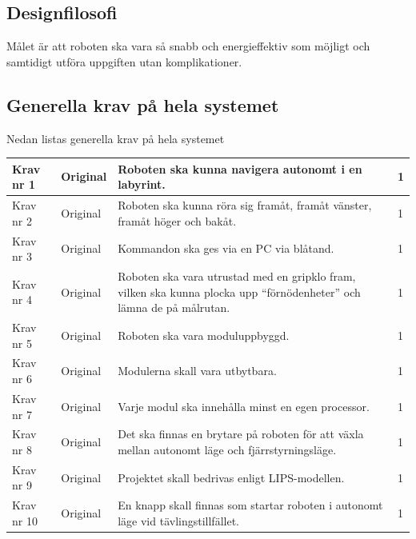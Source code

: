 \documentclass[11pt]{article}
\begin{document}
\begin{flushleft}
\subsection{Designfilosofi}
Målet är att roboten ska vara så snabb och energieffektiv som möjligt och samtidigt utföra uppgiften utan komplikationer. 

\subsection{Generella krav på hela systemet}
Nedan listas generella krav på hela systemet
\\
\begin{center}
\begin{longtable}{|l|l|p{.70\linewidth}|l|} \hline

Krav nr 1 & 
Original & 
Roboten ska kunna navigera autonomt i en labyrint. & 
1 \\ \hline

Krav nr 2 & 
Original & 
Roboten ska kunna röra sig framåt, framåt vänster, framåt höger och bakåt. & 
1 \\ \hline

Krav nr 3 &
Original &
Kommandon ska ges via en PC via blåtand. &
1 \\ \hline

Krav nr 4 &
Original &
Roboten ska vara utrustad med en gripklo fram, vilken ska kunna plocka upp “förnödenheter” och lämna de på målrutan. &
1 \\ \hline

Krav nr 5 &
Original &
Roboten ska vara moduluppbyggd. &
1 \\ \hline

Krav nr 6 &
Original &
Modulerna skall vara utbytbara. &
1 \\ \hline

Krav nr 7 &
Original &
Varje modul ska innehålla minst en egen processor. &
1 \\ \hline

Krav nr 8 &
Original &
Det ska finnas en brytare på roboten för att växla mellan autonomt läge och fjärrstyrningsläge. &
1 \\ \hline

Krav nr 9 &
Original & 
Projektet skall bedrivas enligt LIPS-modellen.&
1 \\ \hline

Krav nr 10 &
Original &
En knapp skall finnas som startar roboten i autonomt läge vid tävlingstillfället. &
1 \\ \hline


\end{longtable}
\end{center}
\end{flushleft}
\end{document}
